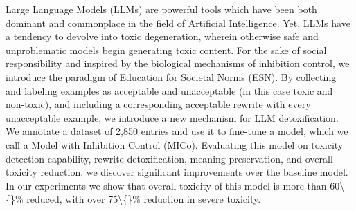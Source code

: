 Large Language Models (LLMs) are powerful tools which have been both dominant and commonplace in the field of Artificial Intelligence. Yet, LLMs have a tendency to devolve into toxic degeneration, wherein otherwise safe and unproblematic models begin generating toxic content. For the sake of social responsibility and inspired by the biological mechanisms of inhibition control, we introduce the paradigm of Education for Societal Norms (ESN). By collecting and labeling examples as acceptable and unacceptable (in this case toxic and non-toxic), and including a corresponding acceptable rewrite with every unacceptable example, we introduce a new mechanism for LLM detoxification.  We annotate a dataset of 2,850 entries and use it to fine-tune a model, which we call a Model with Inhibition Control (MICo). Evaluating this model on toxicity detection capability, rewrite detoxification, meaning preservation, and overall toxicity reduction, we discover significant improvements over the baseline model. In our experiments we show that overall toxicity of this model is more than 60\textbackslash\{\}\% reduced, with over 75\textbackslash\{\}\% reduction in severe toxicity.
